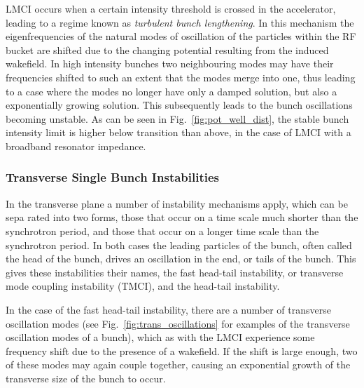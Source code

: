 LMCI occurs when a certain intensity threshold is crossed in the accelerator, leading to a regime known as \emph{turbulent bunch lengthening}. In this mechanism the eigenfrequencies of the natural modes of oscillation of the particles within the RF bucket are shifted due to the changing potential resulting from the induced wakefield. In high intensity bunches two neighbouring modes may have their frequencies shifted to such an extent that the modes merge into one, thus leading to a case where the modes no longer have only a damped solution, but also a exponentially growing solution. This subsequently leads to the bunch oscillations becoming unstable. As can be seen in Fig.~\ref{fig:pot_well_dist}, the stable bunch intensity limit is higher below transition than above, in the case of LMCI with a broadband resonator impedance.

\subsubsection{Transverse Single Bunch Instabilities}

In the transverse plane a number of instability mechanisms apply, which can be sepa
rated into two forms, those that occur on a time scale much shorter than the synchrotron period, and those that occur on a longer time scale than the synchrotron period. In both cases the leading particles of the bunch, often called the head of the bunch, drives an oscillation in the end, or tails of the bunch. This gives these instabilities their names, the fast head-tail instability, or transverse mode coupling instability (TMCI), and the head-tail instability.

In the case of the fast head-tail instability, there are a number of transverse oscillation modes (see Fig.~\ref{fig:trans_oscillations} for examples of the transverse oscillation modes of a bunch), which as with the LMCI experience some frequency shift due to the presence of a wakefield. If the shift is large enough, two of these modes may again couple together, causing an exponential growth of the transverse size of the bunch to occur.

